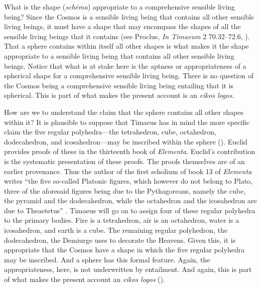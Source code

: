 What is the shape (\emph{schēma}) appropriate to a comprehensive sensible living being? Since the Cosmos is a sensible living being that contains all other sensible living beings, it must have a shape that may encompass the shapes of all the sensible living beings that it contains (see Proclus, \emph{In Timaeum} 2 70.32--72.6, \citealt{Diehl:1903re}). That a sphere contains within itself all other shapes is what makes it the shape appropriate to a sensible living being that contains all other sensible living beings. Notice that what is at stake here is the aptness or appropriateness of a spherical shape for a comprehensive sensible living being. There is no question of the Cosmos being a comprehensive sensible living being entailing that it is spherical. This is part of what makes the present account is an \emph{eikos logos}.

How are we to understand the claim that the sphere contains all other shapes within it? It is plausible to suppose that Timaeus has in mind the more specific claim the five regular polyhedra---the tetrahedron, cube, octahedron, dodecahedron, and icosahedron---may be inscribed within the sphere (\citealt[101--2]{Taylor:1928qb}). Euclid provides proofs of these in the thirteenth book of \emph{Elementa}. Euclid's contribution is the systematic presentation of these proofs. The proofs themselves are of an earlier provenance. Thus the author of the first scholium of book 13 of \emph{Elementa} writes ``the five so-called Platonic figures, which however do not belong to Plato, three of the aforesaid figures being due to the Pythagoreans, namely the cube, the pyramid and the dodecahedron, while the octahedron and the icosahedron are due to Theaetetus'' \citep[438]{Heath:1908th}. Timaeus will go on to assign four of these regular polyhedra to the primary bodies. Fire is a tetrahedron, air is an octahedron, water is a icosahedron, and earth is a cube. The remaining regular polyhedron, the dodecahedron, the Demiurge uses to decorate the Heavens. Given this, it is appropriate that the Cosmos have a shape in which the five regular polyhedra may be inscribed. And a sphere has this formal feature. Again, the appropriateness, here, is not underwritten by entailment. And again, this is part of what makes the present account an \emph{eikos logos} (\citealt[101]{Taylor:1928qb}).

